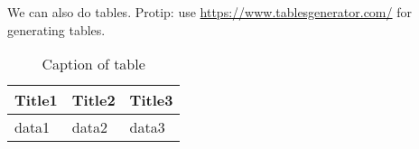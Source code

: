 We can also do tables. Protip: use \url{https://www.tablesgenerator.com/} for generating tables.
\begin{table}[H]
\centering
\caption{Caption of table}
\label{TableLabel}
\begin{tabular}{|l|l|l|}
\hline
Title1 & Title2 & Title3 \\ \hline
data1  & data2  & data3  \\ \hline
\end{tabular}
\end{table}


